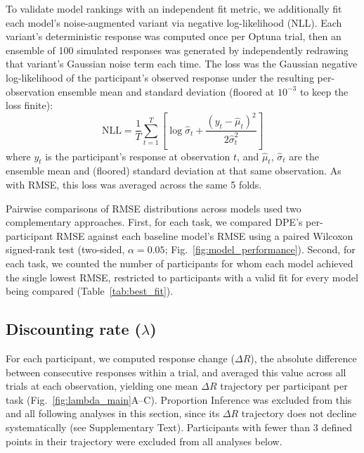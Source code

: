 \documentclass[12pt]{article}
\begin{document}
To validate model rankings with an independent fit metric, we additionally fit each model's noise-augmented variant via negative log-likelihood (NLL). Each variant's deterministic response was computed once per Optuna trial, then an ensemble of 100 simulated responses was generated by independently redrawing that variant's Gaussian noise term each time. The loss was the Gaussian negative log-likelihood of the participant's observed response under the resulting per-observation ensemble mean and standard deviation (floored at $10^{-3}$ to keep the loss finite):
\begin{equation}
\label{eq:nll}
\text{NLL} = \frac{1}{T}\sum_{t=1}^T \left[\log\hat\sigma_t + \frac{(y_t - \hat\mu_t)^2}{2\hat\sigma_t^2}\right]
\end{equation}
where $y_t$ is the participant's response at observation $t$, and $\hat\mu_t$, $\hat\sigma_t$ are the ensemble mean and (floored) standard deviation at that same observation. As with RMSE, this loss was averaged across the same 5 folds.

Pairwise comparisons of RMSE distributions across models used two complementary approaches. First, for each task, we compared DPE's per-participant RMSE against each baseline model's RMSE using a paired Wilcoxon signed-rank test (two-sided, $\alpha=0.05$; Fig.~\ref{fig:model_performance}). Second, for each task, we counted the number of participants for whom each model achieved the single lowest RMSE, restricted to participants with a valid fit for every model being compared (Table~\ref{tab:best_fit}).

\subsection{Discounting rate ($\lambda$)}
For each participant, we computed response change ($\Delta R$), the absolute difference between consecutive responses within a trial, and averaged this value across all trials at each observation, yielding one mean $\Delta R$ trajectory per participant per task (Fig.~\ref{fig:lambda_main}A--C). Proportion Inference was excluded from this and all following analyses in this section, since its $\Delta R$ trajectory does not decline systematically (see Supplementary Text). Participants with fewer than 3 defined points in their trajectory were excluded from all analyses below.
\end{document}
